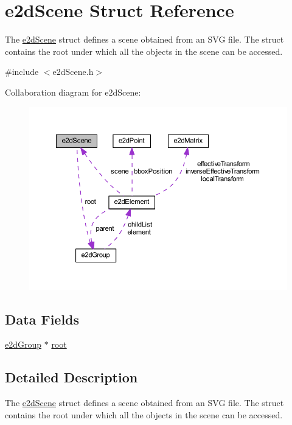 \hypertarget{structe2dScene}{\section{e2d\-Scene Struct Reference}
\label{structe2dScene}
}


The \hyperlink{structe2dScene}{e2d\-Scene} struct defines a scene obtained from an S\-V\-G file. The struct contains the root under which all the objects in the scene can be accessed.  




{\ttfamily \#include $<$e2d\-Scene.\-h$>$}



Collaboration diagram for e2d\-Scene\-:\nopagebreak
\begin{figure}[H]
\begin{center}
\leavevmode
\includegraphics[width=350pt]{structe2dScene__coll__graph}
\end{center}
\end{figure}
\subsection*{Data Fields}
\begin{DoxyCompactItemize}
\item 
\hyperlink{structe2dGroup}{e2d\-Group} $\ast$ \hyperlink{structe2dScene_aa5444ac46bf18449921a4094bcadde1c}{root}
\end{DoxyCompactItemize}


\subsection{Detailed Description}
The \hyperlink{structe2dScene}{e2d\-Scene} struct defines a scene obtained from an S\-V\-G file. The struct contains the root under which all the objects in the scene can be accessed. 

